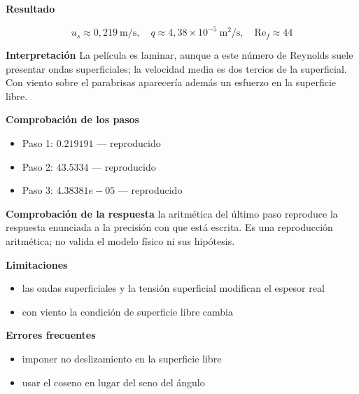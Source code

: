 \documentclass[10pt,openany]{book}
\begin{document}
\begin{tcolorbox}[title={Problema resuelto}, studiumworked, breakable]
\noindent\textbf{Resultado}

\[
u_s \approx 0{,}219\ \mathrm{m/s},\quad q \approx 4{,}38\times 10^{-5}\ \mathrm{m^{2}/s},\quad \mathrm{Re}_f \approx 44
\]

\noindent\textbf{Interpretación}
La película es laminar, aunque a este número de Reynolds suele presentar ondas superficiales; la velocidad media es dos tercios de la superficial. Con viento sobre el parabrisas aparecería además un esfuerzo en la superficie libre.

\noindent\textbf{Comprobación de los pasos}
\begin{itemize}
\item Paso 1: $0.219191$ — reproducido
\item Paso 2: $43.5334$ — reproducido
\item Paso 3: $4.38381e-05$ — reproducido
\end{itemize}

\noindent\textbf{Comprobación de la respuesta} la aritmética del último paso reproduce la respuesta enunciada a la precisión con que está escrita. Es una reproducción aritmética; no valida el modelo físico ni sus hipótesis.

\noindent\textbf{Limitaciones}
\begin{itemize}
\item las ondas superficiales y la tensión superficial modifican el espesor real
\item con viento la condición de superficie libre cambia
\end{itemize}

\noindent\textbf{Errores frecuentes}
\begin{itemize}
\item imponer no deslizamiento en la superficie libre
\item usar el coseno en lugar del seno del ángulo
\end{itemize}
\end{tcolorbox}
\end{document}
